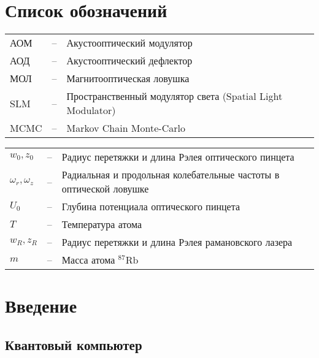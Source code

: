 

\section*{Список обозначений}

\begin{tabular}{lll}
	АОМ & -- & Акустооптический модулятор \\
	АОД & -- & Акустооптический дефлектор \\
	МОЛ & -- & Магнитооптическая ловушка \\



	SLM & -- & Пространственный модулятор света (Spatial Light Modulator) \\
	MCMC & -- & Markov Chain Monte-Carlo \\
\end{tabular}

\begin{tabular}{lll}
	$w_0, z_0$ & -- & Радиус перетяжки и длина Рэлея оптического пинцета \\
	$\omega_r, \omega_z$ & -- & Радиальная и продольная колебательные частоты в оптической ловушке \\
	$U_0$ & -- & Глубина потенциала оптического пинцета \\
	$T$ & -- & Температура атома \\
	$w_{R}, z_{R}$ & -- & Радиус перетяжки и длина Рэлея рамановского лазера \\
	$m$ & -- & Масса атома $^{87}\text{Rb}$ \\
\end{tabular}


\newpage



\section{Введение}
\label{sec:Introduction} 


\subsection{Квантовый компьютер}



